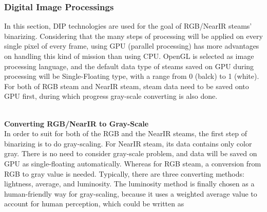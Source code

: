 \subsubsection{Digital Image Processings}
In this section, DIP technologies are used for the goal of RGB/NearIR steams' binarizing. Considering that the many steps of processing will be applied on every single pixel of every frame, using GPU (parallel processing) has more advantages on handling this kind of mission than using CPU. OpenGL is selected as image processing language, and the default data type of steams saved on GPU during processing will be Single-Floating type, with a range from 0 (balck) to 1 (white). For both of RGB steam and NearIR steam, steam data need to be saved onto GPU first, during which progress gray-scale converting is also done.\\%
\\\par%
 \qquad \textbf{Converting RGB/NearIR to Gray-Scale}\\%
In order to suit for both of the RGB and the NearIR steams, the first step of binarizing is to do gray-scaling. For NearIR steam, its data contains only color gray. There is no need to consider gray-scale problem, and data will be saved on GPU as single-floating automatically. Whereas for RGB steam, a conversion from RGB to gray value is needed. Typically, there are three converting methods: lightness, average, and luminosity. The luminosity method is finally chosen as a human-friendly way for gray-scaling, because it uses a weighted average value to account for human perception, which could be written as

